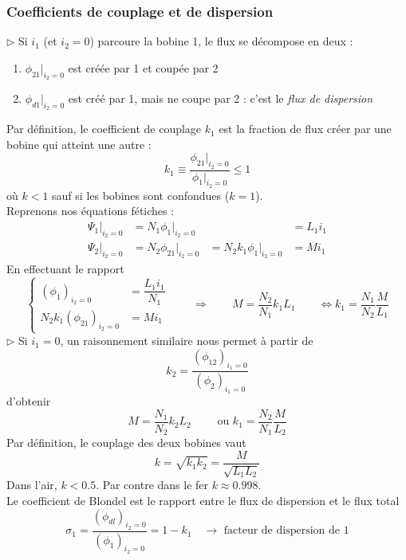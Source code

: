 		\subsubsection{Coefficients de couplage et de dispersion}
		$\triangleright$ Si $i_1$ (et $i_2=0$) parcoure la bobine 1, le flux se décompose en deux :
		\begin{enumerate}
		\item $\phi_{21}|_{i_2=0}$ est créée par 1 et coupée par 2
		\item $\phi_{d1}|_{i_2=0}$ est créé par 1, mais ne coupe par 2 : c'est le 
		\textit{flux de dispersion}
		\end{enumerate}
		Par définition, le coefficient de couplage $k_1$ est la fraction de flux 
		créer par une bobine qui atteint une autre :
		\begin{equation}
		k_1 \equiv \frac{\phi_{21}|_{i_2=0}}{\phi_1|_{i_2=0}}\leq 1
		\end{equation}
		où $k<1$ sauf si les bobines sont confondues ($k=1$).\\
		Reprenons nos équations fétiches :
		\begin{equation}
		\begin{array}{llll}
		\Psi_1|_{i_2=0} &= N_1\phi_1|_{i_2=0}& &= L_1i_1\\
		\Psi_2|_{i_2=0} &= N_2\phi_{21}|_{i_2=0}&= N_2k_1\phi_1|_{i_2=0} &= Mi_1		
		\end{array}
		\end{equation}
		En effectuant le rapport 
		\begin{equation}
		\left\{\begin{array}{ll}
		(\phi_1)_{i_2=0} &= \dfrac{L_1i_1}{N_1}\\
		N_2k_1(\phi_{21})_{i_2=0} &= Mi_1
		\end{array}\right.\qquad \Longrightarrow \qquad
		M = \frac{N_2}{N_1}k_1L_1\qquad \Leftrightarrow k_1 = \frac{N_1}{N_2}\frac{M}{L_1}
		\label{eq:3.23}
		\end{equation}
		$\triangleright$ Si $i_1=0$, un raisonnement similaire nous permet à partir de 
		\begin{equation}
		k_2 = \frac{(\phi_{12})_{i_1=0}}{(\phi_2)_{i_1=0}}
		\end{equation}
		d'obtenir 
		\begin{equation}
		M = \frac{N_1}{N_2}k_2L_2\qquad \text{ ou } k_1 = \frac{N_2}{N_1}\frac{M}{L_2}
		\end{equation}	
		Par définition, le couplage des deux bobines vaut
		\begin{equation}
		k = \sqrt{k_1k_2} = \frac{M}{\sqrt{L_1L_2}}
		\end{equation}
		Dans l'air, $k<0.5$. Par contre dans le fer $k \approx 0.998$.\\
		Le coefficient de Blondel est le rapport entre le flux de dispersion et le flux 
		total
		\begin{equation}
		\sigma_1 = \frac{(\phi_{dl})_{i_2=0}}{(\phi_1)_{i_2=0}} = 1-k_1\quad \rightarrow 
		\text{ facteur de dispersion de 1}
		\end{equation}
		
